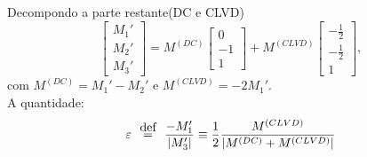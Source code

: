 \documentclass{beamer}
\newcommand\myeq{\stackrel{\mathclap{\normalfont\mbox{def}}}{=}}
\begin{document}
\begin{frame}{Decompondo a parte restante(DC e CLVD)}
	\justifying
	\begin{equation}
	\begin{bmatrix}
	M_1' \\
	M_2' \\
	M_3'
	\end{bmatrix} = M^{(DC)}\begin{bmatrix}
	0 \\
	-1 \\
	1
	\end{bmatrix} + M^{(CLVD)}
	\begin{bmatrix}
	-\frac{1}{2} \\
	-\frac{1}{2}\\
	1
	\end{bmatrix},
	\nonumber
	\end{equation} 
	com $M^{(DC)} = M_1'-M_2'$ e $M^{(CLVD)} = -2M_1'$.\\
	A quantidade:
	\begin{equation}
      \varepsilon \ \ \myeq \ \ \frac{-M_1'}{|M_3'|}  \equiv \frac{1}{2}\frac{M^{(CLVD)}}{|M^{(DC)}+M^{(CLVD)}|}                  \nonumber
	\end{equation}
\end{frame}

%
%
\end{document}
